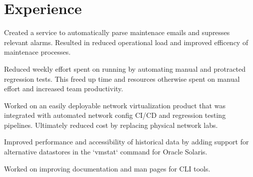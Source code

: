 \documentclass[]{resume}
\begin{document}
\begin{minipage}[t]{0.70\textwidth}

\section{Experience}

\vspace{2pt}
\vspace{10pt}
\begin{tightemize}
\item  Created a service to automatically parse maintenace emails and supresses
relevant alarms. Resulted in reduced operational load and improved efficency
of maintenace processes.
\item Reduced weekly effort spent on running by automating manual and protracted regression tests.
This freed up time and resources otherwise spent on manual effort and increased team productivity.
\item Worked on an easily deployable network virtualization product that was integrated with
automated network config CI/CD and regression testing pipelines. Ultimately reduced cost by
replacing physical network labs.
\end{tightemize}
\subsectionsep

\vspace{2pt}
\vspace{1pt}
\begin{tightemize}
\item Improved performance and accessibility of historical data by adding support for
alternative datastores in the `vmstat` command for Oracle Solaris.
\item Worked on improving documentation and man pages for CLI tools.
\end{tightemize}
\subsectionsep  %


\end{minipage}
\end{document}
